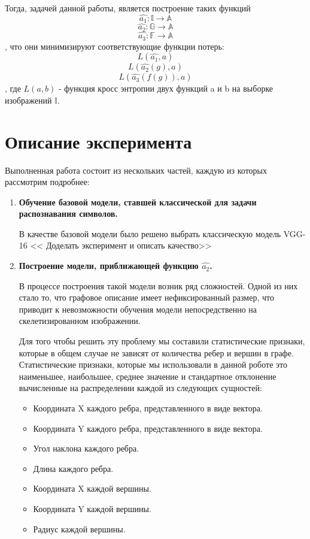 \documentclass[12pt, twoside]{article}
\begin{document}
Тогда, задачей данной работы, является построение таких функций
 $$\hat{a_1}: \mathbb{I} \rightarrow \mathbb{A}$$
 $$ \hat{a_2}: \mathbb{G} \rightarrow \mathbb{A} $$ 
 $$\hat{a_3}: \mathbb{F} \rightarrow \mathbb{A}$$
 , что они минимизируют соответствующие функции потерь:
 $$L(\hat{a_1}, a)$$
 $$L(\hat{a_2}(g), a)$$ 
 $$L(\hat{a_3}(f(g)), a)$$
 , где $L(a, b)$ - функция кросс энтропии двух функций a и b на выборке изображений $\mathbb{I}$.
 
 
 \section{Описание эксперимента}
 Выполненная работа состоит из нескольких частей, каждую из которых рассмотрим подробнее:
 \begin{enumerate}
 \item \textbf{Обучение базовой модели, ставшей классической для задачи распознавания символов.}
 
 В качестве базовой модели было решено выбрать классическую модель VGG-16  << Доделать эксперимент и описать качество>>
  
 \item \textbf{Построение модели, приближающей функцию $ \hat{a_2} $.}
 
 В процессе построения такой модели возник ряд сложностей. Одной из них стало то, что графовое описание имеет нефиксированный размер, что приводит к невозможности обучения модели непосредственно на скелетизированном изображении. 
 
Для того чтобы решить эту проблему мы составили статистические признаки, которые в общем случае не зависят от количества ребер и вершин в графе. Статистические признаки, которые мы использовали в данной роботе это наименьшее, наибольшее, среднее значение и стандартное отклонение вычисленные на распределении каждой из следующих сущностей:
 
 \begin{itemize}
 \item Координата X каждого ребра, представленного в виде вектора.
 \item Координата Y каждого ребра, представленного в виде вектора.
 \item Угол наклона каждого ребра.
 \item Длина каждого ребра.
 \item Координата X каждой вершины.
 \item Координата Y каждой вершины.
 \item Радиус каждой вершины.
 \end{itemize}
 

\end{enumerate}
\end{document}
